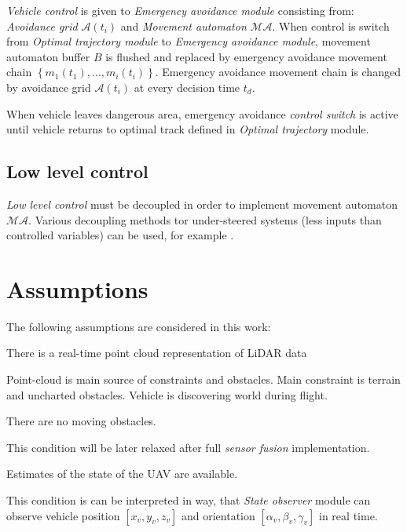 \textit{Vehicle control} is given to \textit{Emergency avoidance module} consisting from: \textit{Avoidance grid} $\mathscr{A}(t_i)$ and \textit{Movement automaton} $\mathscr{MA}$. When control is switch from \textit{Optimal trajectory module} to \textit{Emergency avoidance module}, movement automaton buffer $B$ is flushed and replaced by emergency avoidance movement chain $\left\{m_1(t_1),\dots,m_i(t_i)\right\}$. Emergency avoidance movement chain is changed by avoidance grid $\mathscr{A}(t_i)$ at every decision time $t_d$.

When vehicle leaves dangerous area, emergency avoidance \textit{control switch} is active until vehicle returns to optimal track defined in \textit{Optimal trajectory} module.

\subsection*{Low level control}
\noindent \textit{Low level control} must be decoupled in order to implement movement automaton $\mathscr{MA}$. Various decoupling methods tor under-steered systems (less inputs than controlled variables) can be used, for example \cite{das2009dynamic}.

\section{Assumptions}
\noindent
The following assumptions are considered in this work:
\begin{assumption}{There is a real-time point cloud representation of LiDAR data}\label{ass:1}\end{assumption}
\noindent Point-cloud is main source of constraints and obstacles. Main constraint is terrain and uncharted obstacles. Vehicle is discovering world during flight.  

\begin{assumption}{There are no moving obstacles.}\label{ass:3}\end{assumption}
\noindent This condition will be later relaxed after full \textit{sensor fusion} implementation.

\begin{assumption}{Estimates of the state of the UAV are available.}\label{ass:4}\end{assumption}
\noindent This condition is can be interpreted in way, that \textit{State observer} module can observe vehicle position $[x_v,y_v,z_v]$ and orientation $[\alpha_v,\beta_v,\gamma_v]$ in real time. 

